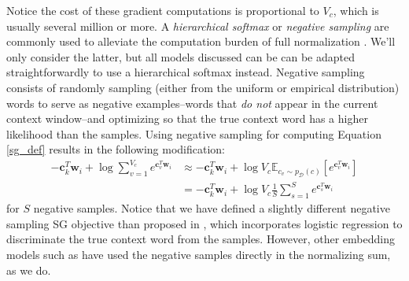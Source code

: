 \documentclass{article} %
\begin{document}
Notice the cost of these gradient computations is proportional to $V_{c}$, which is usually several million or more.  A \textit{hierarchical softmax} or \textit{negative sampling} are commonly used to alleviate the computation burden of full normalization \citep{mikolov2013distributed}.  We'll only consider the latter, but all models discussed can be can be adapted straightforwardly to use a hierarchical softmax instead.  Negative sampling consists of randomly sampling (either from the uniform or empirical distribution) words to serve as negative examples--words that \textit{do not} appear in the current context window--and optimizing so that the true context word has a higher likelihood than the samples.  Using negative sampling for computing Equation \ref{sg_def} results in the following modification:  \begin{equation}\begin{split}\label{sg_w_neg} - \mathbf{c}_{k}^{T}\mathbf{w}_{i} + \log \sum_{v=1}^{V_{c}} e^{\mathbf{c}_{v}^{T}\mathbf{w}_{i}} &\approx - \mathbf{c}_{k}^{T}\mathbf{w}_{i} + \log V_{c} \mathbb{E}_{c_{v} \sim p_{\mathcal{D}}(c)} [e^{\mathbf{c}_{v}^{T}\mathbf{w}_{i}}] \\ &= -\mathbf{c}_{k}^{T}\mathbf{w}_{i} + \log V_{c} \frac{1}{S} \sum_{s=1}^{S} e^{\mathbf{c}_{s}^{T}\mathbf{w}_{i}} \end{split}\end{equation} for $S$ negative samples.  Notice that we have defined a slightly different negative sampling SG objective than proposed in \cite{mikolov2013distributed}, which incorporates logistic regression to discriminate the true context word from the samples.  However, other embedding models such as \cite{huang2013learning} have used the negative samples directly in the normalizing sum, as we do.  
\end{document}
